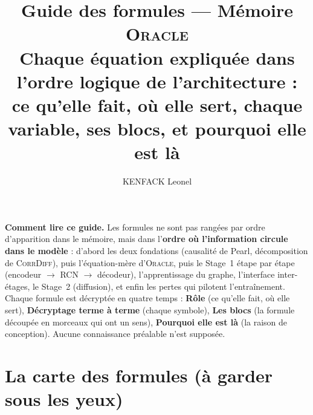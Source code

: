 \documentclass[11pt,a4paper]{article}
\title{\textcolor{bleu}{\textbf{Guide des formules --- Mémoire \textsc{Oracle}}}\\[2mm]
\large Chaque équation expliquée dans l'ordre logique de l'architecture :\\ ce qu'elle fait, où elle sert, chaque variable, ses blocs, et pourquoi elle est là}
\author{KENFACK Leonel}
\date{}
\newcommand{\Oracle}{\textsc{Oracle}}
\newcommand{\CorrDiff}{\textsc{CorrDiff}}
\begin{document}
\maketitle

\begin{mdframed}[backgroundcolor=grisclair,linecolor=bleu,linewidth=0.6pt,roundcorner=3pt]
\textbf{Comment lire ce guide.} Les formules ne sont pas rangées par ordre d'apparition dans le mémoire, mais dans l'\textbf{ordre où l'information circule dans le modèle} : d'abord les deux fondations (causalité de Pearl, décomposition de \CorrDiff{}), puis l'équation-mère d'\Oracle{}, puis le Stage~1 étape par étape (encodeur $\to$ RCN $\to$ décodeur), l'apprentissage du graphe, l'interface inter-étages, le Stage~2 (diffusion), et enfin les pertes qui pilotent l'entraînement. Chaque formule est décryptée en quatre temps : \textbf{Rôle} (ce qu'elle fait, où elle sert), \textbf{Décryptage terme à terme} (chaque symbole), \textbf{Les blocs} (la formule découpée en morceaux qui ont un sens), \textbf{Pourquoi elle est là} (la raison de conception). Aucune connaissance préalable n'est supposée.
\end{mdframed}

\tableofcontents
\newpage

\section{La carte des formules (à garder sous les yeux)}
\end{document}
